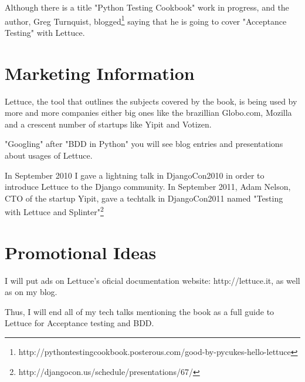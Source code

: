 \documentclass[letterpaper]{article}
\begin{document}
\noindent
Although there is a title "Python Testing Cookbook" work in progress,
and the author, Greg Turnquist, blogged\footnote{http://pythontestingcookbook.posterous.com/good-by-pycukes-hello-lettuce} saying that he is going to cover
"Acceptance Testing" with Lettuce.

\section*{Marketing Information}

Lettuce, the tool that outlines the subjects covered by the book, is
being used by more and more companies either big ones like the
brazillian Globo.com, Mozilla and a crescent number of startups like
Yipit and Votizen.

\noindent
"Googling" after "BDD in Python" you will see blog entries and
presentations about usages of Lettuce.

\noindent
In September 2010 I gave a lightning talk in DjangoCon2010 in order to introduce Lettuce to the Django community.
In September 2011, Adam Nelson, CTO of the startup Yipit, gave a techtalk in DjangoCon2011 named "Testing with Lettuce and Splinter"\footnote{http://djangocon.us/schedule/presentations/67/}
\section*{Promotional Ideas}

I will put ads on Lettuce's oficial documentation website:
http://lettuce.it, as well as on my blog.

\noindent
Thus, I will end all of my tech talks mentioning the book as a full
guide to Lettuce for Acceptance testing and BDD.
\end{document}
